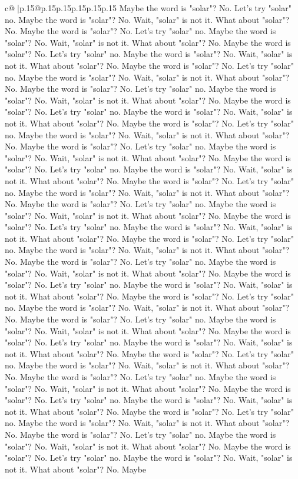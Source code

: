 \documentclass{article}
\begin{document}
{\begin{supertabular}{c@{$\;$}|p{.15\linewidth}@{}p{.15\linewidth}p{.15\linewidth}p{.15\linewidth}p{.15\linewidth}p{.15\linewidth}}
{{{Maybe the word is "solar"? No. Let's try "solar" no. Maybe the word is "solar"? No. Wait, "solar" is not it. What about "solar"? No. Maybe the word is "solar"? No. Let's try "solar" no. Maybe the word is "solar"? No. Wait, "solar" is not it. What about "solar"? No. Maybe the word is "solar"? No. Let's try "solar" no. Maybe the word is "solar"? No. Wait, "solar" is not it. What about "solar"? No. Maybe the word is "solar"? No. Let's try "solar" no. Maybe the word is "solar"? No. Wait, "solar" is not it. What about "solar"? No. Maybe the word is "solar"? No. Let's try "solar" no. Maybe the word is "solar"? No. Wait, "solar" is not it. What about "solar"? No. Maybe the word is "solar"? No. Let's try "solar" no. Maybe the word is "solar"? No. Wait, "solar" is not it. What about "solar"? No. Maybe the word is "solar"? No. Let's try "solar" no. Maybe the word is "solar"? No. Wait, "solar" is not it. What about "solar"? No. Maybe the word is "solar"? No. Let's try "solar" no. Maybe the word is "solar"? No. Wait, "solar" is not it. What about "solar"? No. Maybe the word is "solar"? No. Let's try "solar" no. Maybe the word is "solar"? No. Wait, "solar" is not it. What about "solar"? No. Maybe the word is "solar"? No. Let's try "solar" no. Maybe the word is "solar"? No. Wait, "solar" is not it. What about "solar"? No. Maybe the word is "solar"? No. Let's try "solar" no. Maybe the word is "solar"? No. Wait, "solar" is not it. What about "solar"? No. Maybe the word is "solar"? No. Let's try "solar" no. Maybe the word is "solar"? No. Wait, "solar" is not it. What about "solar"? No. Maybe the word is "solar"? No. Let's try "solar" no. Maybe the word is "solar"? No. Wait, "solar" is not it. What about "solar"? No. Maybe the word is "solar"? No. Let's try "solar" no. Maybe the word is "solar"? No. Wait, "solar" is not it. What about "solar"? No. Maybe the word is "solar"? No. Let's try "solar" no. Maybe the word is "solar"? No. Wait, "solar" is not it. What about "solar"? No. Maybe the word is "solar"? No. Let's try "solar" no. Maybe the word is "solar"? No. Wait, "solar" is not it. What about "solar"? No. Maybe the word is "solar"? No. Let's try "solar" no. Maybe the word is "solar"? No. Wait, "solar" is not it. What about "solar"? No. Maybe the word is "solar"? No. Let's try "solar" no. Maybe the word is "solar"? No. Wait, "solar" is not it. What about "solar"? No. Maybe the word is "solar"? No. Let's try "solar" no. Maybe the word is "solar"? No. Wait, "solar" is not it. What about "solar"? No. Maybe the word is "solar"? No. Let's try "solar" no. Maybe the word is "solar"? No. Wait, "solar" is not it. What about "solar"? No. Maybe the word is "solar"? No. Let's try "solar" no. Maybe the word is "solar"? No. Wait, "solar" is not it. What about "solar"? No. Maybe the word is "solar"? No. Let's try "solar" no. Maybe the word is "solar"? No. Wait, "solar" is not it. What about "solar"? No. Maybe the word is "solar"? No. Let's try "solar" no. Maybe the word is "solar"? No. Wait, "solar" is not it. What about "solar"? No. Maybe the word is "solar"? No. Let's try "solar" no. Maybe the word is "solar"? No. Wait, "solar" is not it. What about "solar"? No. Maybe }}}
\end{supertabular}}
\end{document}
